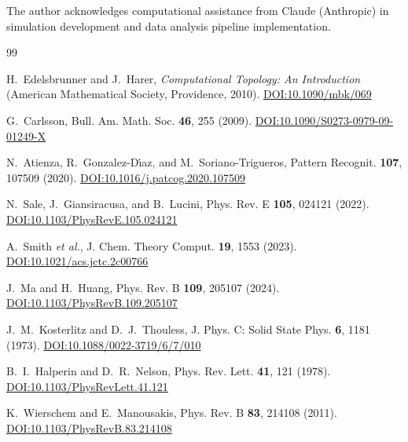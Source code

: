 \documentclass[twocolumn,showpacs,preprintnumbers,amsmath,amssymb,prb,floatfix]{revtex4-2}
\begin{document}
\bigskip

\begin{acknowledgments}
The author acknowledges computational assistance from Claude (Anthropic) in simulation development and data analysis pipeline implementation.
\end{acknowledgments}

\begin{thebibliography}{99}

H.~Edelsbrunner and J.~Harer, \textit{Computational Topology: An Introduction} (American Mathematical Society, Providence, 2010). \href{https://doi.org/10.1090/mbk/069}{DOI:10.1090/mbk/069}

G.~Carlsson, Bull. Am. Math. Soc. \textbf{46}, 255 (2009). \href{https://doi.org/10.1090/S0273-0979-09-01249-X}{DOI:10.1090/S0273-0979-09-01249-X}

N.~Atienza, R.~Gonzalez-D\'{\i}az, and M.~Soriano-Trigueros, Pattern Recognit. \textbf{107}, 107509 (2020). \href{https://doi.org/10.1016/j.patcog.2020.107509}{DOI:10.1016/j.patcog.2020.107509}

N.~Sale, J.~Giansiracusa, and B.~Lucini, Phys. Rev. E \textbf{105}, 024121 (2022). \href{https://doi.org/10.1103/PhysRevE.105.024121}{DOI:10.1103/PhysRevE.105.024121}

A.~Smith \textit{et al.}, J. Chem. Theory Comput. \textbf{19}, 1553 (2023). \href{https://doi.org/10.1021/acs.jctc.2c00766}{DOI:10.1021/acs.jctc.2c00766}

J.~Ma and H.~Huang, Phys. Rev. B \textbf{109}, 205107 (2024). \href{https://doi.org/10.1103/PhysRevB.109.205107}{DOI:10.1103/PhysRevB.109.205107}

J.~M.~Kosterlitz and D.~J.~Thouless, J. Phys. C: Solid State Phys. \textbf{6}, 1181 (1973). \href{https://doi.org/10.1088/0022-3719/6/7/010}{DOI:10.1088/0022-3719/6/7/010}

B.~I.~Halperin and D.~R.~Nelson, Phys. Rev. Lett. \textbf{41}, 121 (1978). \href{https://doi.org/10.1103/PhysRevLett.41.121}{DOI:10.1103/PhysRevLett.41.121}

K.~Wierschem and E.~Manousakis, Phys. Rev. B \textbf{83}, 214108 (2011). \href{https://doi.org/10.1103/PhysRevB.83.214108}{DOI:10.1103/PhysRevB.83.214108}


\end{thebibliography}
\end{document}
